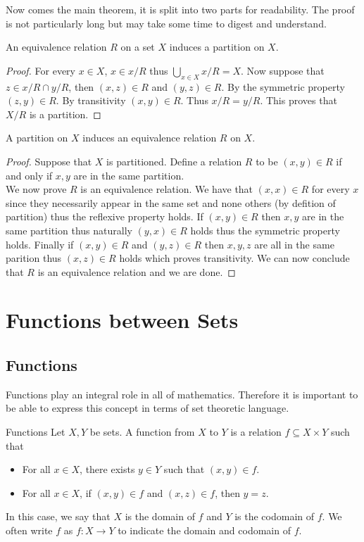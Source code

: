 \documentclass[a4paper]{article}
\begin{document}
Now comes the main theorem, it is split into two parts for readability. The proof is not particularly long but may take some time to digest and understand. 

\begin{thm}{}{} An equivalence relation $R$ on a set $X$ induces a partition on $X$. 
\begin{proof}
For every $x\in X$, $x\in x/R$ thus $\bigcup_{x\in X}x/R=X$. Now suppose that $z\in x/R\cap y/R$, then $(x,z)\in R$ and $(y,z)\in R$. By the symmetric property $(z,y)\in R$. By transitivity $(x,y)\in R$. Thus $x/R=y/R$. This proves that $X/R$ is a partition. 
\end{proof}
\end{thm}

\begin{thm}{}{} A partition on $X$ induces an equivalence relation $R$ on $X$. 
\begin{proof} Suppose that $X$ is partitioned. Define a relation $R$ to be $(x,y)\in R$ if and only if $x,y$ are in the same partition. \\

We now prove $R$ is an equivalence relation. We have that $(x,x)\in R$ for every $x$ since they necessarily appear in the same set and none others (by defition of partition) thus the reflexive property holds. If $(x,y)\in R$ then $x,y$ are in the same partition thus naturally $(y,x)\in R$ holds thus the symmetric property holds. Finally if $(x,y)\in R$ and $(y,z)\in R$ then $x,y,z$ are all in the same parition thus $(x,z)\in R$ holds which proves transitivity. We can now conclude that $R$ is an equivalence relation and we are done. 
\end{proof}
\end{thm}

\pagebreak
\section{Functions between Sets}
\subsection{Functions}
Functions play an integral role in all of mathematics. Therefore it is important to be able to express this concept in terms of set theoretic language. 
\begin{defn}{Functions}{} Let $X,Y$ be sets. A function from $X$ to $Y$ is a relation $f\subseteq X\times Y$ such that
\begin{itemize}
\item For all $x\in X$, there exists $y\in Y$ such that $(x,y)\in f$. 
\item For all $x\in X$, if $(x,y)\in f$ and $(x,z)\in f$, then $y=z$. 
\end{itemize}
In this case, we say that $X$ is the domain of $f$ and $Y$ is the codomain of $f$. We often write $f$ as $f:X\to Y$ to indicate the domain and codomain of $f$. 
\end{defn}
\end{document}
